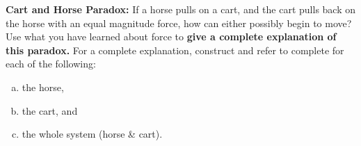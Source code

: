 \label{fnt8.1.1-1}

\textbf{Cart and Horse Paradox:} If a horse pulls on a cart, and the cart pulls back on the horse with an equal magnitude force, how can either possibly begin to move?\\

\noindent Use what you have learned about force to \textbf{give a complete explanation of this paradox.} For a complete explanation, construct and refer to complete \forcediags{} for each of the following:

\begin{enumerate}[(a)]
	\item the horse, 
	\item the cart, and 
	\item the whole system (horse \& cart).
\end{enumerate}